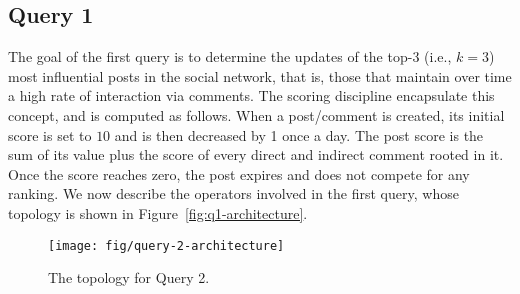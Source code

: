 \subsection{Query 1}
\label{sec:solution-q1}

The goal of the first query is to determine the updates of the top-3 (i.e., $k=3$) most influential posts in the social network, that is, those that maintain over time a high rate of interaction via comments. 
The scoring discipline encapsulate this concept, and is computed as follows. 
When a post/comment is created, its initial score is set to $10$ and is then decreased by 1 once a day. The post score is the sum of its value plus the score of every direct and indirect comment rooted in it. Once the score reaches zero, the post expires and does not compete for any ranking.
%
We now describe the operators involved in the first query, whose topology is shown in Figure~\ref{fig:q1-architecture}.  

\begin{figure*}[ht]
	\centering
	\texttt{[image: fig/query-2-architecture]}
	\caption{The topology for Query 2.}
	\label{fig:q2-architecture}
\end{figure*}

